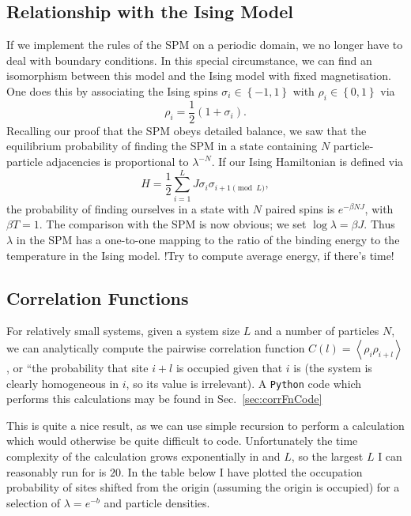 \subsection{Relationship with the Ising Model}
If we implement the rules of the SPM on a periodic domain, we no longer have to deal with boundary conditions. In this special circumstance, we can find an isomorphism between this model and the Ising model with fixed magnetisation.
One does this by associating the Ising spins $\sigma_i \in \left\{-1, 1 \right\}$ with $\rho_i \in \left\{ 0, 1 \right\}$ via
\begin{equation}
 \rho_i = \frac{1}{2}\left(1+\sigma_i\right).
\end{equation}
Recalling our proof that the SPM obeys detailed balance, we saw that the equilibrium probability of finding the SPM in a state containing $N$ particle-particle adjacencies is proportional to $\lambda^{-N}$.
If our Ising Hamiltonian is defined via
\begin{equation}
 H = \frac{1}{2} \sum_{i=1}^L J \sigma_i \sigma_{i+1 \pmod L},
\end{equation}
the probability of finding ourselves in a state with $N$ paired spins is $e^{-\beta N J}$, with $\beta T =1$. The comparison with the SPM is now obvious; we set $\log{\lambda} = \beta J$. Thus $\lambda$ in the SPM has a one-to-one mapping to the ratio of the binding energy to the temperature in the Ising model.
!Try to compute average energy, if there's time!


\subsection{Correlation Functions}
For relatively small systems, given a system size $L$ and a number of particles $N$, we can analytically compute the pairwise correlation function $C(l) = \left\langle \rho_i \rho_{i+l} \right\rangle$, or ``the probability that site $i+l$
is occupied given that $i$ is (the system is clearly homogeneous in $i$, so its value is irrelevant).
A \texttt{Python} code which performs this calculations may be found in Sec.~\ref{sec:corrFnCode}


This is quite a nice result, as we can use simple recursion to perform a calculation which would otherwise be quite difficult to code.
Unfortunately the time complexity of the calculation grows exponentially in and $L$, so the largest $L$ I can reasonably run for is $20$. In the table below I have plotted the occupation probability of sites shifted from the origin
(assuming the origin is occupied)  for a selection of $\lambda = e^{-b}$ and particle densities.

